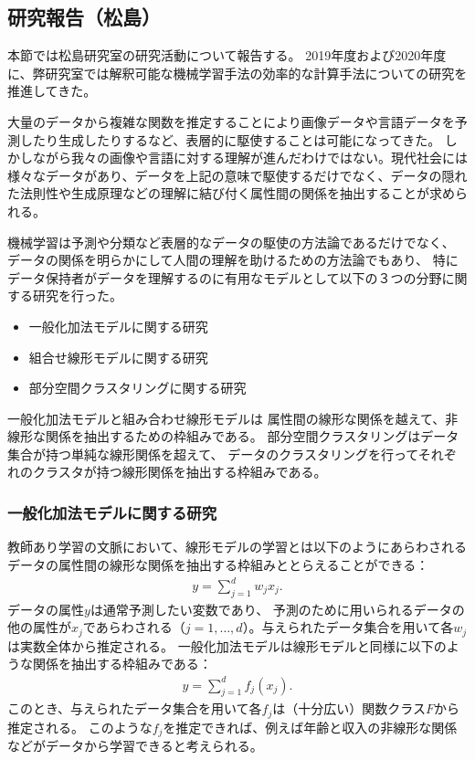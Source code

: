 \subsection{研究報告（松島）}
本節では松島研究室の研究活動について報告する。
2019年度および2020年度に、弊研究室では解釈可能な機械学習手法の効率的な計算手法についての研究を推進してきた。

大量のデータから複雑な関数を推定することにより画像データや言語データを予測したり生成したりするなど、表層的に駆使することは可能になってきた。
しかしながら我々の画像や言語に対する理解が進んだわけではない。現代社会には様々なデータがあり、データを上記の意味で駆使するだけでなく、データの隠れた法則性や生成原理などの理解に結び付く属性間の関係を抽出することが求められる。

機械学習は予測や分類など表層的なデータの駆使の方法論であるだけでなく、
データの関係を明らかにして人間の理解を助けるための方法論でもあり、
特にデータ保持者がデータを理解するのに有用なモデルとして以下の３つの分野に関する研究を行った。
\begin{itemize}
    \item 一般化加法モデルに関する研究
    \item 組合せ線形モデルに関する研究
    \item 部分空間クラスタリングに関する研究
\end{itemize}

一般化加法モデルと組み合わせ線形モデルは
属性間の線形な関係を越えて、非線形な関係を抽出するための枠組みである。
部分空間クラスタリングはデータ集合が持つ単純な線形関係を超えて、
データのクラスタリングを行ってそれぞれのクラスタが持つ線形関係を抽出する枠組みである。


\subsubsection{一般化加法モデルに関する研究}
教師あり学習の文脈において、線形モデルの学習とは以下のようにあらわされるデータの属性間の線形な関係を抽出する枠組みととらえることができる：
\begin{align*}
    y = \sum_{j=1}^d w_j x_j.
\end{align*}
データの属性$y$は通常予測したい変数であり、
予測のために用いられるデータの他の属性が$x_j$であらわされる（$j=1,\ldots,d$）。与えられたデータ集合を用いて各$w_j$は実数全体から推定される。
一般化加法モデル\cite{F}は線形モデルと同様に以下のような関係を抽出する枠組みである：
\begin{align*}
    y = \sum_{j=1}^d f_j (x_j).
\end{align*}
このとき、与えられたデータ集合を用いて各$f_j$は（十分広い）関数クラス$F$から推定される。
このような$f_j$を推定できれば、例えば年齢と収入の非線形な関係などがデータから学習できると考えられる。

